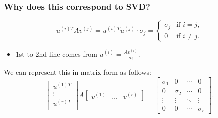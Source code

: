 \subsubsection{Why does this correspond to SVD?}
\begin{derivation}
    \[
    u^{(i) T} A v^{(j)} = u^{(i) T} u^{(j)} \cdot \sigma_j = 
    \begin{cases} 
        \sigma_j & \text{if } i = j, \\
        0 & \text{if } i \neq j.
    \end{cases}
    \]
    \begin{itemize}
        \item 1st to 2nd line comes from $u^{(i)} = \frac{A v^{(i)}}{\sigma_i}$.
    \end{itemize}
    \vspace{1em}

    We can represent this in matrix form as follows:
    \[
    \begin{bmatrix}
    u^{(1) T} \\
    \vdots \\
    u^{(r) T} \\
    \end{bmatrix}
    A 
    \begin{bmatrix}
    v^{(1)} & \dots & v^{(r)}
    \end{bmatrix}
    =
    \begin{bmatrix}
    \sigma_1 & 0 & \cdots & 0 \\
    0 & \sigma_2 & \cdots & 0 \\
    \vdots & \vdots & \ddots & \vdots \\
    0 & 0 & \cdots & \sigma_r
    \end{bmatrix}.
    \]
\end{derivation}

